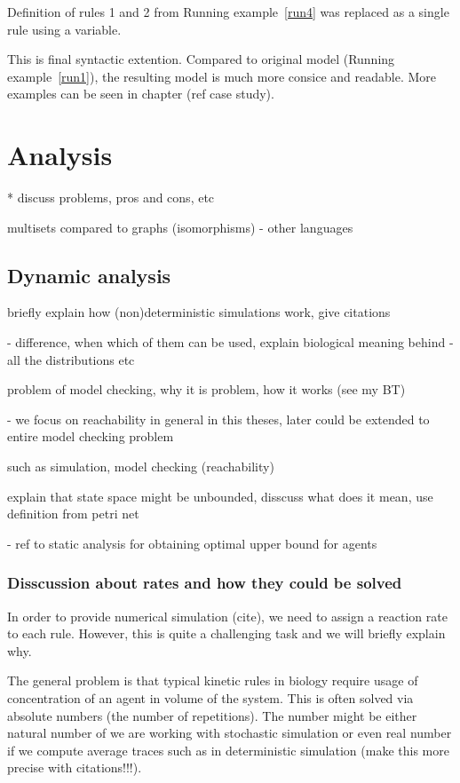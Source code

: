 \documentclass[12pt]{fithesis2}
\begin{document}
\noindent Definition of rules 1 and 2 from Running example~\ref{run4} was replaced as a single rule using a variable.

This is final syntactic extention. Compared to original model (Running example~\ref{run1}), the resulting model is much more consice and readable. More examples can be seen in chapter (ref case study).

\chapter{Analysis}

* discuss problems, pros and cons, etc

multisets compared to graphs (isomorphisms) - other languages

\section{Dynamic analysis}

briefly explain how (non)deterministic simulations work, give citations

 - difference, when which of them can be used, explain biological meaning behind
 - all the distributions etc

problem of model checking, why it is problem, how it works (see my BT) 

 - we focus on reachability in general in this theses, later could be extended to entire model checking problem

such as simulation, model checking (reachability)

explain that state space might be unbounded, disscuss what does it mean, use definition from petri net

 - ref to static analysis for obtaining optimal upper bound for agents

\subsection{Disscussion about rates and how they could be solved}

In order to provide numerical simulation (cite), we need to assign a reaction rate to each rule. However, this is quite a challenging task and we will briefly explain why.

The general problem is that typical kinetic rules in biology require usage of concentration of an agent in volume of the system. This is often solved via absolute numbers (the number of repetitions). The number might be either natural number of we are working with stochastic simulation or even real number if we compute average traces such as in deterministic simulation (make this more precise with citations!!!).
\end{document}
